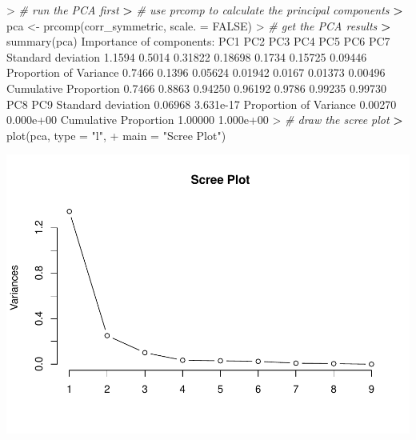 \documentclass[
]{article}
\newenvironment{Shaded}{\begin{snugshade}}{\end{snugshade}}
\newcommand{\AttributeTok}[1]{\textcolor[rgb]{0.77,0.63,0.00}{#1}}
\newcommand{\CommentTok}[1]{\textcolor[rgb]{0.56,0.35,0.01}{\textit{#1}}}
\newcommand{\ConstantTok}[1]{\textcolor[rgb]{0.00,0.00,0.00}{#1}}
\newcommand{\ErrorTok}[1]{\textcolor[rgb]{0.64,0.00,0.00}{\textbf{#1}}}
\newcommand{\FloatTok}[1]{\textcolor[rgb]{0.00,0.00,0.81}{#1}}
\newcommand{\FunctionTok}[1]{\textcolor[rgb]{0.00,0.00,0.00}{#1}}
\newcommand{\NormalTok}[1]{#1}
\newcommand{\OtherTok}[1]{\textcolor[rgb]{0.56,0.35,0.01}{#1}}
\newcommand{\SpecialCharTok}[1]{\textcolor[rgb]{0.00,0.00,0.00}{#1}}
\newcommand{\StringTok}[1]{\textcolor[rgb]{0.31,0.60,0.02}{#1}}
\begin{document}
\begin{Shaded}
\begin{Highlighting}[]
\SpecialCharTok{\textgreater{}} \CommentTok{\# run the PCA first}
\ErrorTok{\textgreater{}} \CommentTok{\# use prcomp to calculate the principal components}
\ErrorTok{\textgreater{}}\NormalTok{ pca }\OtherTok{\textless{}{-}} \FunctionTok{prcomp}\NormalTok{(corr\_symmetric, }\AttributeTok{scale. =} \ConstantTok{FALSE}\NormalTok{)}
\SpecialCharTok{\textgreater{}} \CommentTok{\# get the PCA results}
\ErrorTok{\textgreater{}} \FunctionTok{summary}\NormalTok{(pca)}
\NormalTok{Importance of components}\SpecialCharTok{:}
\NormalTok{                          PC1    PC2     PC3     PC4    PC5     PC6     PC7}
\NormalTok{Standard deviation     }\FloatTok{1.1594} \FloatTok{0.5014} \FloatTok{0.31822} \FloatTok{0.18698} \FloatTok{0.1734} \FloatTok{0.15725} \FloatTok{0.09446}
\NormalTok{Proportion of Variance }\FloatTok{0.7466} \FloatTok{0.1396} \FloatTok{0.05624} \FloatTok{0.01942} \FloatTok{0.0167} \FloatTok{0.01373} \FloatTok{0.00496}
\NormalTok{Cumulative Proportion  }\FloatTok{0.7466} \FloatTok{0.8863} \FloatTok{0.94250} \FloatTok{0.96192} \FloatTok{0.9786} \FloatTok{0.99235} \FloatTok{0.99730}
\NormalTok{                           PC8       PC9}
\NormalTok{Standard deviation     }\FloatTok{0.06968} \FloatTok{3.631e{-}17}
\NormalTok{Proportion of Variance }\FloatTok{0.00270} \FloatTok{0.000e+00}
\NormalTok{Cumulative Proportion  }\FloatTok{1.00000} \FloatTok{1.000e+00}
\SpecialCharTok{\textgreater{}} \CommentTok{\# draw the scree plot }
\ErrorTok{\textgreater{}} \FunctionTok{plot}\NormalTok{(pca, }\AttributeTok{type =} \StringTok{"l"}\NormalTok{, }
\SpecialCharTok{+}      \AttributeTok{main =} \StringTok{"Scree Plot"}\NormalTok{)}
\end{Highlighting}
\end{Shaded}

\includegraphics{HUDM6122-Homework_05-Chenguang-Pan_files/figure-latex/unnamed-chunk-4-1.pdf}
\end{document}
